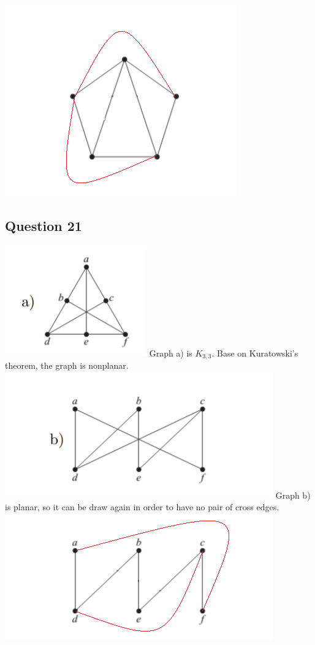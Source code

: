 \documentclass{article}
\begin{document}
\includegraphics[]{Question 20/connectivity_20.c.edited.png}
\newline

\subsection*{Question 21}
\includegraphics[]{Question 21/connectivity_21.a.png}
\newline
Graph a) is $K_{3,3}$. Base on Kuratowski’s theorem, the graph is nonplanar.
\newline
\includegraphics[]{Question 21/connectivity_21.b.png}
\newline
Graph b) is planar, so it can be draw again in order to have no pair of cross edges.
\newline
\includegraphics[]{Question 21/connectivity_21.b.edited.png}
\newline
\end{document}
